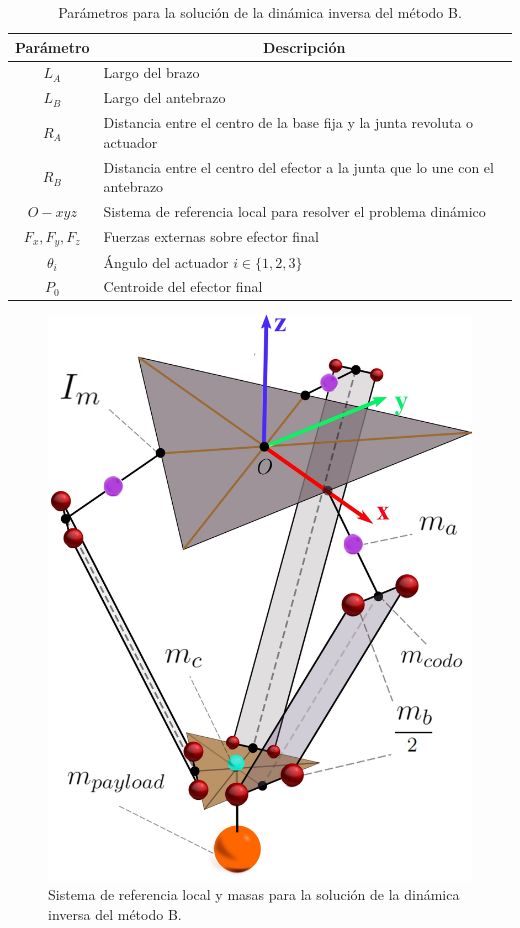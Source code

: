         \begingroup
            \renewcommand{\arraystretch}{1.5}
            \begin{table}[H]
            \centering
            \begin{tabular}{c m{12cm}}
               \hline
               \textbf{Parámetro}  & \multicolumn{1}{c}{\textbf{Descripción}}  \\
               \hline           \hline            
             $L_A$ & Largo del brazo \\
            \hline
             $L_B$ & Largo del antebrazo \\
            \hline
             $R_A$ & Distancia entre el centro de la base fija y la junta revoluta o actuador \\
            \hline
             $R_B$ & Distancia entre el centro del efector a la junta que lo une con el antebrazo\\
            \hline
            ${O} - xyz$ & Sistema de referencia local para resolver el problema dinámico\\
            \hline
             $F_{x},F_{y},F_{z}$ & Fuerzas externas sobre efector final\\
            \hline
            $\theta_i$ & Ángulo del actuador $i \in \{1,2,3\}$\\
            \hline
            $P_0$ & Centroide del efector final\\
            \hline 
            \end{tabular}
            \caption{Parámetros para la solución de la dinámica inversa del método B.}
           \label{tab:cap4_tabla_13}
        \end{table}
        \endgroup     
\newpage

        \begin{figure}[H]
              \centering
	          \includegraphics[width=0.63\linewidth]{Main/Chapter4/Images4/DIBUJO37.jpg}
              \caption{Sistema de referencia local y masas para la solución
de la dinámica inversa del método B.}
              \label{f:Cap4_Metodo_B_Modelacion_Dinamica_2}
        \end{figure}

